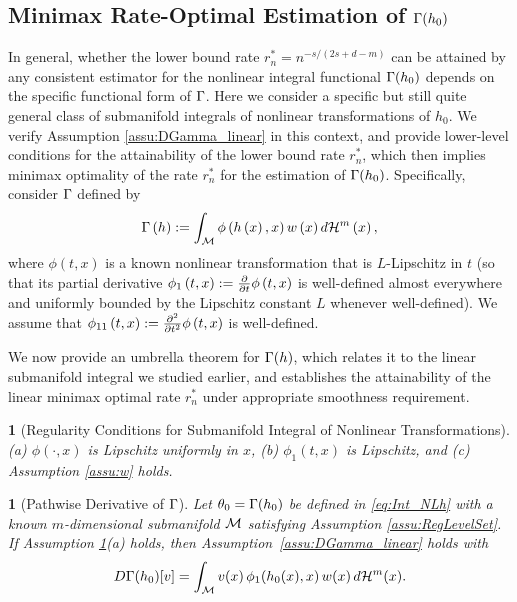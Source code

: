 \documentclass[12pt,american]{article}
\newcommand{\cH}{\mathcal{H}}
\theoremstyle{definition}
\theoremstyle{plain}
\newtheorem{assumption}{\protect\assumptionname}
\theoremstyle{definition}
\theoremstyle{plain}
\newtheorem{lem}{\protect\lemmaname}
\theoremstyle{plain}
\theoremstyle{plain}
\theoremstyle{plain}
\theoremstyle{plain}
\providecommand{\assumptionname}{Assumption}
\providecommand{\lemmaname}{Lemma}
\providecommand{\assumptionname}{Assumption}
\providecommand{\lemmaname}{Lemma}
\begin{document}
\subsection{Minimax Rate-Optimal Estimation of $\Gamma(h_0)$}\label{subsec:Nlh-UB}

In general, whether the lower bound rate $r_n^*=n^{-s/(2s + d - m)}$ can be attained by any consistent estimator for the nonlinear integral functional $\Gamma(h_0)$ depends on the specific functional form of $\Gamma$. Here we consider a specific but still quite general class of submanifold integrals of nonlinear transformations of $h_0$. We verify Assumption \ref{assu:DGamma_linear} in this context, and provide lower-level conditions for the attainability of the lower bound rate $r_n^*$, which then implies minimax optimality of the rate $r_n^*$ for the estimation of $\Gamma(h_0)$.
Specifically, consider $\Gamma$ defined by
\begin{equation}
  \Gamma\left(h\right):=\int_{{\cal M}}\phi\left(h\left(x\right),x\right)w\left(x\right)d{\cal H}^{m}\left(x\right),\label{eq:Int_NLh}
\end{equation}
where  $\phi\left(t,x\right)$ is a known nonlinear transformation that is $L$-Lipschitz in $t$ (so that
  its partial derivative $\phi_{1}\left(t,x\right):=\frac{\partial}{\partial t}\phi\left(t,x\right)$
is well-defined almost everywhere and uniformly bounded by the Lipschitz constant $L$ whenever well-defined). We assume that $\phi_{11}\left(t,x\right):=\frac{\partial^2}{\partial t^2}\phi\left(t,x\right)$ is well-defined.

We now provide an umbrella theorem for $\Gamma(h)$, which relates it to the linear submanifold integral we studied earlier, and establishes the attainability of the linear minimax optimal rate $r_n^*$ under appropriate smoothness requirement.

\begin{assumption}[Regularity Conditions for Submanifold Integral of Nonlinear Transformations]\label{assu:RegCond_Nlh}
  (a) $\phi(\cdot,x)$ is Lipschitz uniformly in $x$,
  (b) $\phi_{1}\left(t,x\right)$ is Lipschitz, and
  (c) Assumption \ref{assu:w} holds.
\end{assumption}
\begin{lem}[Pathwise Derivative of $\Gamma$]\label{lem:NLh-DG}
  Let $\theta_0=\Gamma(h_0)$ be defined in \eqref{eq:Int_NLh} with a known $m$-dimensional submanifold ${\cal M}$ satisfying Assumption \ref{assu:RegLevelSet}. If Assumption \ref{assu:RegCond_Nlh}(a) holds, then Assumption~\ref{assu:DGamma_linear} holds with
  \begin{equation}\label{eq:PathD_NL}
    D\G(h_0)[v] = \int_{\cM} v(x)\, \phi_1(h_0(x),x)\, w(x)\, d\cH^m(x).
  \end{equation}
\end{lem}
\end{document}
